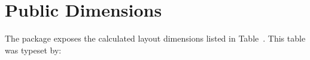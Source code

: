 \documentclass[
11pt,
a4paper,
oneside
]{scrbook}
\begin{document}
\section{Public Dimensions}

The package exposes the calculated layout dimensions listed in Table~.
%	
%	
%	
%	
%	
%	
%	
%	
%	
%	
%	
%	
%	
%	
%	
%	
This table was typeset by:





\end{document}
